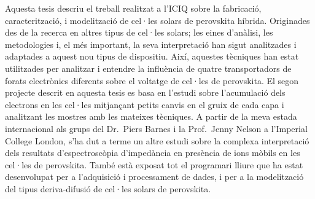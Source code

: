 
Aquesta tesis descriu el treball realitzat a l'ICIQ sobre la fabricació, caracterització, i modelització de cel·les solars de perovskita híbrida.
Originades des de la recerca en altres tipus de cel·les solars; les eines d'anàlisi, les metodologies i, el més important, la seva interpretació han sigut analitzades i adaptades a aquest nou tipus de dispositiu.
Així, aquestes tècniques han estat utilitzades per analitzar i entendre la influència de quatre transportadors de forats electrònics diferents sobre el voltatge de cel·les de perovskita.
El segon projecte descrit en aquesta tesis es basa en l’estudi sobre l'acumulació dels electrons en les cel·les mitjançant petits canvis en el gruix de cada capa i analitzant les mostres amb les mateixes tècniques.
A partir de la meva estada internacional als grups del Dr.\ Piers Barnes i la Prof.\ Jenny Nelson a l'Imperial College London, s'ha dut a terme un altre estudi sobre la complexa interpretació dels resultats d'espectroscòpia d'impedància en presència de ions mòbils en les cel·les de perovskita.
També està exposat tot el programari lliure que ha estat desenvolupat per a l'adquisició i processament de dades, i per a la modelització del tipus deriva-difusió de cel·les solars de perovskita.


\vfill

\EnableQuotes